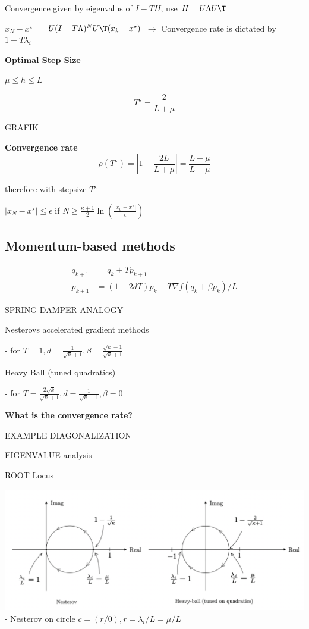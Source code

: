 Convergence given by eigenvalus of $I-TH$,
use $H=U\Lambda U\T$

$x_{N}-x^\star=$
$U(I-T\Lambda)^N U\T(x_k-x^\star)$
$\rightarrow$
Convergence rate is dictated by $1-T\lambda_i$

\textbf{Optimal Step Size}

$\mu \le h \le L$

\[T^\star = \frac{2}{L+\mu}  \]

GRAFIK

\textbf{Convergence rate}
$$\rho (T^\star) = |1-\frac{2L}{L+\mu}|= \frac{L-\mu}{L+\mu}$$

therefore with stepsize $T^\star$

$|x_N - x^\star| \le \epsilon $
if $N \ge \frac{\kappa+1}{2}\operatorname{ln}(\frac{|x_0 - x^\star|}{\epsilon})$

\subsection{Momentum-based methods}
\begin{equation}
	\begin{aligned}
		q_{k+1} & = q_k + Tp_{k+1}                          \\
		p_{k+1} & = (1-2dT)p_k-T\nabla f(q_k + \beta p_k)/L
	\end{aligned}
\end{equation}

SPRING DAMPER ANALOGY

Nesterovs accelerated gradient methods

- for $T = 1, d=\frac{1}{\sqrt{k}+1}, \beta =\frac{\sqrt{k}-1}{\sqrt{k}+1}$

Heavy Ball (tuned quadratics)

- for $T = \frac{2\sqrt{k}}{\sqrt{k}+1}, d=\frac{1}{\sqrt{k}+1},\beta =0$


\textbf{What is the convergence rate?}

EXAMPLE DIAGONALIZATION

EIGENVALUE analysis

ROOT Locus

\includegraphics[width=\columnwidth]{images/root-locus-momentum.png}
- Nesterov on circle $c=(r/0), r=\lambda_i/L = \mu /L$

